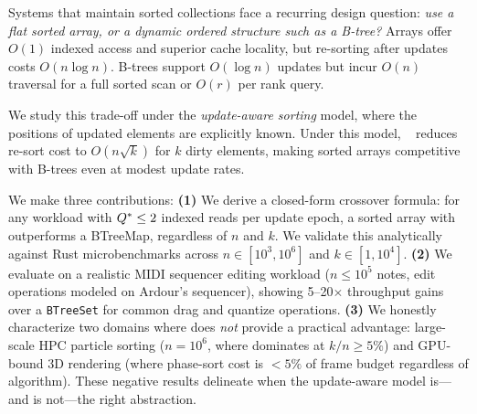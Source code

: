 Systems that maintain sorted collections face a recurring design question:
\emph{use a flat sorted array, or a dynamic ordered structure such as a B-tree?}
Arrays offer $O(1)$ indexed access and superior cache locality, but re-sorting
after updates costs $O(n \log n)$. B-trees support $O(\log n)$ updates but
incur $O(n)$ traversal for a full sorted scan or $O(r)$ per rank query.

We study this trade-off under the \emph{update-aware sorting} model, where
the positions of updated elements are explicitly known. Under this model,
\DeltaSort~\cite{deltasort} reduces re-sort cost to $O(n\sqrt{k})$ for $k$ dirty
elements, making sorted arrays competitive with B-trees even at modest update rates.

We make three contributions:
\textbf{(1)} We derive a closed-form crossover formula: for any workload with
$Q^* \leq 2$ indexed reads per update epoch, a sorted array with \DeltaSort
outperforms a BTreeMap, regardless of $n$ and $k$.
We validate this analytically against Rust microbenchmarks across
$n \in [10^3, 10^6]$ and $k \in [1, 10^4]$.
\textbf{(2)} We evaluate \DeltaSort on a realistic MIDI sequencer editing workload
($n \leq 10^5$ notes, edit operations modeled on Ardour's sequencer),
showing 5--20$\times$ throughput gains over a \texttt{BTreeSet} for common
drag and quantize operations.
\textbf{(3)} We honestly characterize two domains where \DeltaSort does \emph{not}
provide a practical advantage: large-scale HPC particle sorting ($n = 10^6$, where
\ESM dominates at $k/n \geq 5\%$) and GPU-bound 3D rendering (where
phase-sort cost is $<5\%$ of frame budget regardless of algorithm).
These negative results delineate when the update-aware model is---and is not---the
right abstraction.
